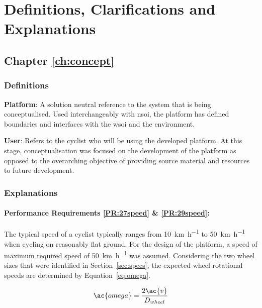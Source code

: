 \newpage

\chapter{Definitions, Clarifications and Explanations}

\label{ch:defs}

\section{Chapter \ref{ch:concept}}

\subsection*{Definitions}

\label{sec:defs3}

\textbf{Platform}: A solution neutral reference to the system that is being conceptualised. Used interchangeably with \acf{nsoi}, the platform has defined boundaries and interfaces with the \acf{wsoi} and the environment.

\textbf{User}: Refers to the cyclist who will be using the developed platform. At this stage, conceptualisation was focused on the development of the platform as opposed to the overarching objective of providing source material and resources to future development.

\subsection*{Explanations}

\subsubsection{Performance Requirements \ref{PR:27speed} \& \ref{PR:29speed}:}

The typical speed of a cyclist typically ranges from \SI{10}{\kilo\meter\per\hour} to \SI{50}{\kilo\meter\per\hour} when cycling on reasonably flat ground. For the design of the platform, a speed of maximum required speed of \SI{50}{\kilo\meter\per\hour} was assumed. Considering the two wheel sizes that were identified in Section~\ref{sec:specs}, the expected wheel rotational speeds are determined by Equation~\ref{eq:omega}.

\begin{equation}
	\ac{omega} = \frac{2 \ac{v}}{D_{wheel}}
	\label{eq:omega}
\end{equation}

